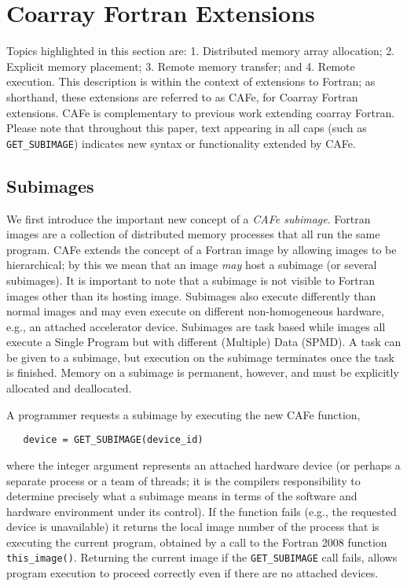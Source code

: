 \section{Coarray Fortran Extensions}

Topics highlighted in this section are: 1. Distributed memory array allocation;
2. Explicit memory placement; 3. Remote memory transfer; and 4. Remote execution.  This
description is within the context of extensions to Fortran; as shorthand, these extensions
are referred to as CAFe, for Coarray Fortran extensions.  CAFe is complementary to
previous work extending coarray Fortran\cite{mellor-crummey:2009:caf2,jin:2011:caf2}.
Please note that throughout this paper, text appearing in all caps (such as
\texttt{GET\_SUBIMAGE}) indicates new syntax or functionality extended by CAFe.



\subsection{Subimages}

We first introduce the important new concept of a \emph{CAFe subimage}.  Fortran images
are a collection of distributed memory processes that all run the same program.  CAFe
extends the concept of a Fortran image by allowing images to be hierarchical; by this we
mean that an image \emph{may} host a subimage (or several subimages).  It is important to
note that a subimage is not visible to Fortran images other than its hosting image.
Subimages also execute differently than normal images and may even execute on different
non-homogeneous hardware, e.g., an attached accelerator device.  Subimages are task based
while images all execute a Single Program but with different (Multiple) Data (SPMD).  A
task can be given to a subimage, but execution on the subimage terminates once the task is
finished.  Memory on a subimage is permanent, however, and must be explicitly allocated
and deallocated.

A programmer requests a subimage by executing the new CAFe function,

\small
\begin{verbatim}
   device = GET_SUBIMAGE(device_id)
\end{verbatim}
\normalsize

\noindent where the integer argument represents an attached hardware device (or perhaps a separate
process or a team of threads; it is the compilers responsibility to determine precisely
what a subimage means in terms of the software and hardware environment under its
control).  If the function fails (e.g., the requested device is unavailable) it returns
the local image number of the process that is executing the current program, obtained by a
call to the Fortran 2008 function \texttt{this\_image()}.  Returning the current image if
the \texttt{GET\_SUBIMAGE} call fails, allows program execution to proceed correctly even if
there are no attached devices.

